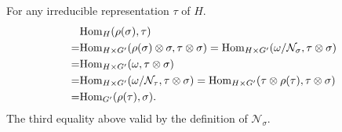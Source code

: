 \documentclass[12pt]{article}
\def\Hom{{\rm Hom}}
\def\cnn{\mathcal{N}}
\begin{document}
For any irreducible representation $\tau$ of $H$.
\[
\begin{split}
&\Hom_{H}(\rho(\sigma), \tau)\\
= & \Hom_{H\times G'}(\rho(\sigma)\otimes \sigma, \tau\otimes \sigma)
=  \Hom_{H\times G'}(\omega/\cnn_\sigma, \tau\otimes \sigma)\\
= & \Hom_{H\times G'}(\omega, \tau\otimes \sigma)\\
= & \Hom_{H\times G'}(\omega/\cnn_\tau, \tau\otimes \sigma)
= \Hom_{H\times G'}(\tau\otimes \rho(\tau), \tau\otimes \sigma)\\
= & \Hom_{G'}(\rho(\tau), \sigma).
\end{split}
\]
The third equality above valid by the definition of $\cnn_\sigma$. 



{}

\end{document}
